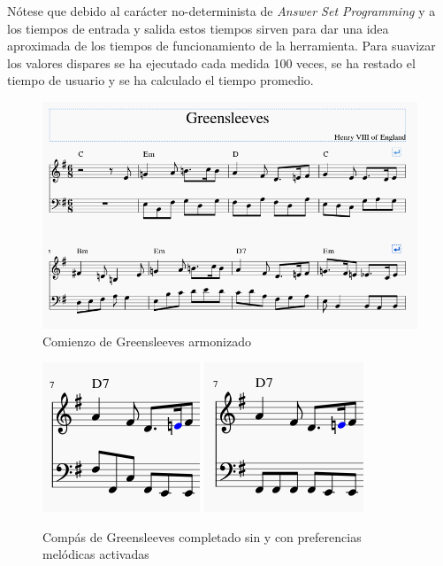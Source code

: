  Nótese que debido al carácter no-determinista de \textit{Answer Set Programming} y a los tiempos de entrada y salida estos tiempos sirven para dar una idea aproximada de los tiempos de funcionamiento de la herramienta. Para suavizar los valores dispares se ha ejecutado cada medida 100 veces, se ha restado el tiempo de usuario y se ha calculado el tiempo promedio. 


\begin{figure}
	\centering
	\includegraphics[width=0.8\linewidth]{imagenes/evaluation/greensleeves_harm.png}
	\caption{Comienzo de Greensleeves armonizado}
	\label{fig:greensleeves_harm}
\end{figure}

\begin{figure}
   	\centering
   	\includegraphics[width=0.4\linewidth]{imagenes/evaluation/greensleeves_measure.png}
   	\includegraphics[width=0.4\linewidth]{imagenes/evaluation/greensleeves_measure_melodious.png}
   	\caption{Compás de Greensleeves completado sin y con preferencias melódicas activadas}
   	\label{fig:greensleeves_measure}
\end{figure}

